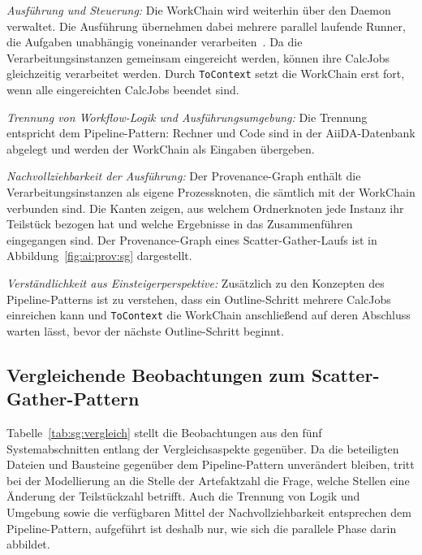\emph{Ausführung und Steuerung:} Die WorkChain wird weiterhin über
den Daemon verwaltet. Die Ausführung übernehmen dabei mehrere parallel laufende Runner, die Aufgaben unabhängig voneinander verarbeiten~\cite[S.~3]{huber2020aiida}. Da die
Verarbeitungsinstanzen gemeinsam eingereicht werden, können ihre
CalcJobs gleichzeitig verarbeitet werden. Durch \texttt{ToContext}
setzt die WorkChain erst fort, wenn alle eingereichten CalcJobs
beendet sind.


\emph{Trennung von Workflow-Logik und Ausführungsumgebung:} Die
Trennung entspricht dem Pipeline-Pattern: Rechner und Code sind in
der AiiDA-Datenbank abgelegt und werden der WorkChain als Eingaben
übergeben.


\emph{Nachvollziehbarkeit der Ausführung:} Der Provenance-Graph
enthält die Verarbeitungsinstanzen als eigene Prozessknoten, die
sämtlich mit der WorkChain verbunden sind. Die Kanten zeigen, aus
welchem Ordnerknoten jede Instanz ihr Teilstück bezogen hat und
welche Ergebnisse in das Zusammenführen eingegangen sind. Der
Provenance-Graph eines Scatter-Gather-Laufs ist in
Abbildung~\ref{fig:ai:prov:sg} dargestellt.

\emph{Verständlichkeit aus Einsteigerperspektive:} Zusätzlich zu den
Konzepten des Pipeline-Patterns ist zu verstehen, dass ein
Outline-Schritt mehrere CalcJobs einreichen kann und
\texttt{ToContext} die WorkChain anschließend auf deren Abschluss
warten lässt, bevor der nächste Outline-Schritt beginnt.

\subsection{Vergleichende Beobachtungen zum Scatter-Gather-Pattern}
\label{sec:lokal:sg:zusammenfassung}

Tabelle~\ref{tab:sg:vergleich} stellt die Beobachtungen aus den fünf
Systemabschnitten entlang der Vergleichsaspekte gegenüber. Da die
beteiligten Dateien und Bausteine gegenüber dem Pipeline-Pattern
unverändert bleiben, tritt bei der Modellierung an die Stelle der
Artefaktzahl die Frage, welche Stellen eine Änderung der
Teilstückzahl betrifft. Auch die Trennung von Logik und Umgebung
sowie die verfügbaren Mittel der Nachvollziehbarkeit entsprechen dem
Pipeline-Pattern, aufgeführt ist deshalb nur, wie sich die parallele
Phase darin abbildet.

